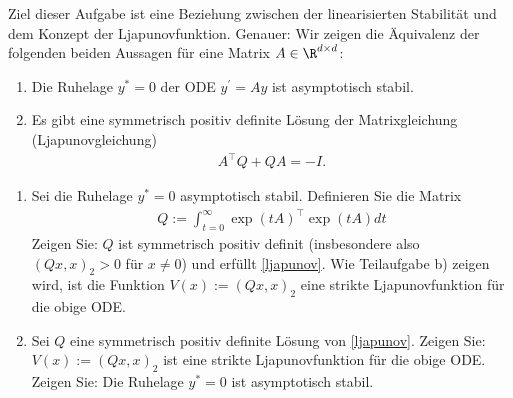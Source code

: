 \begin{exercise}
Ziel dieser Aufgabe ist eine Beziehung zwischen der linearisierten Stabilität und
dem Konzept der Ljapunovfunktion. Genauer: Wir zeigen die Äquivalenz der folgenden
beiden Aussagen für eine Matrix $A \in \R^{d \times d}$:
\begin{enumerate}
  \item Die Ruhelage $y^* = 0$ der ODE $y^{\prime} = Ay$ ist asymptotisch stabil.
  \item Es gibt eine symmetrisch positiv definite Lösung der Matrixgleichung
  (\glqq Ljapunovgleichung\grqq)
  \begin{align} \label{ljapunov}
    A^{\top}Q + QA = -I.
  \end{align}
\end{enumerate}
\begin{enumerate}[label = \textbf{\alph*)}]
  \item Sei die Ruhelage $y^* = 0$ asymptotisch stabil. Definieren Sie die Matrix
  \begin{align*}
    Q := \int_{t = 0}^{\infty} \exp(tA)^{\top}\exp(tA) dt
  \end{align*}
  Zeigen Sie: $Q$ ist symmetrisch positiv definit (insbesondere also $(Qx,x)_2 > 0$
  für $x \neq 0$) und erfüllt \eqref{ljapunov}. Wie Teilaufgabe b) zeigen wird,
  ist die Funktion $V(x) := (Qx,x)_2$ eine strikte Ljapunovfunktion für die obige ODE.
  \item Sei $Q$ eine symmetrisch positiv definite Lösung von \eqref{ljapunov}.
  Zeigen Sie: $V(x) := (Qx,x)_2$ ist eine strikte Ljapunovfunktion für die obige ODE.
  Zeigen Sie: Die Ruhelage $y^* = 0$ ist asymptotisch stabil.
\end{enumerate}
\end{exercise}
